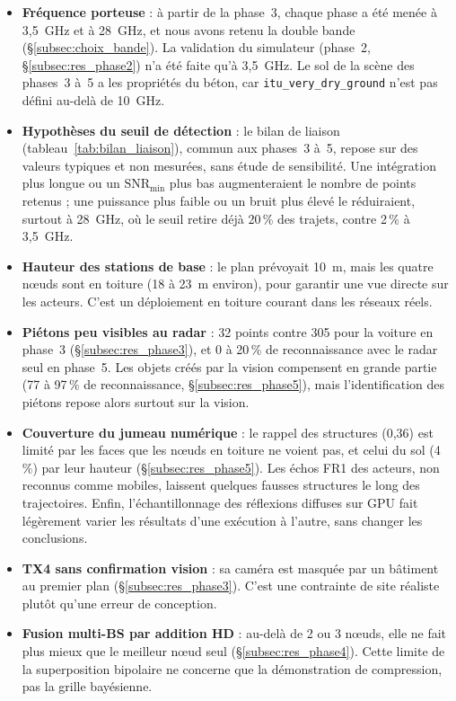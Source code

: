 \documentclass[12pt,a4paper,titlepage]{article}
\begin{document}
\begin{itemize}[leftmargin=1.5em]
    \item \textbf{Fréquence porteuse} : à partir de la phase~3, chaque phase a été menée à 3,5~GHz et à 28~GHz, et nous avons retenu la double bande (\S\ref{subsec:choix_bande}). La validation du simulateur (phase~2, \S\ref{subsec:res_phase2}) n'a été faite qu'à 3,5~GHz. Le sol de la scène des phases~3 à~5 a les propriétés du béton, car \texttt{itu\_very\_dry\_ground} n'est pas défini au-delà de 10~GHz.
    \item \textbf{Hypothèses du seuil de détection} : le bilan de liaison (tableau~\ref{tab:bilan_liaison}), commun aux phases~3 à~5, repose sur des valeurs typiques et non mesurées, sans étude de sensibilité. Une intégration plus longue ou un $\mathrm{SNR}_{\min}$ plus bas augmenteraient le nombre de points retenus ; une puissance plus faible ou un bruit plus élevé le réduiraient, surtout à 28~GHz, où le seuil retire déjà 20\,\% des trajets, contre 2\,\% à 3,5~GHz.
    \item \textbf{Hauteur des stations de base} : le plan prévoyait 10~m, mais les quatre n\oe uds sont en toiture (18 à 23~m environ), pour garantir une vue directe sur les acteurs. C'est un déploiement en toiture courant dans les réseaux réels.
    \item \textbf{Piétons peu visibles au radar} : 32 points contre 305 pour la voiture en phase~3 (\S\ref{subsec:res_phase3}), et 0 à 20\,\% de reconnaissance avec le radar seul en phase~5. Les objets créés par la vision compensent en grande partie (77 à 97\,\% de reconnaissance, \S\ref{subsec:res_phase5}), mais l'identification des piétons repose alors surtout sur la vision.
    \item \textbf{Couverture du jumeau numérique} : le rappel des structures (0,36) est limité par les faces que les n\oe uds en toiture ne voient pas, et celui du sol (4\,\%) par leur hauteur (\S\ref{subsec:res_phase5}). Les échos FR1 des acteurs, non reconnus comme mobiles, laissent quelques fausses structures le long des trajectoires. Enfin, l'échantillonnage des réflexions diffuses sur GPU fait légèrement varier les résultats d'une exécution à l'autre, sans changer les conclusions.
    \item \textbf{TX4 sans confirmation vision} : sa caméra est masquée par un bâtiment au premier plan (\S\ref{subsec:res_phase3}). C'est une contrainte de site réaliste plutôt qu'une erreur de conception.
    \item \textbf{Fusion multi-BS par addition HD} : au-delà de 2 ou 3 n\oe uds, elle ne fait plus mieux que le meilleur n\oe ud seul (\S\ref{subsec:res_phase4}). Cette limite de la superposition bipolaire ne concerne que la démonstration de compression, pas la grille bayésienne.

\end{itemize}
\end{document}
